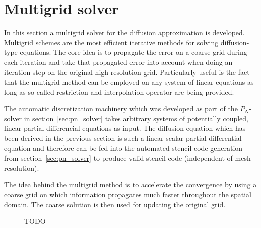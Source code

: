 \section{Multigrid solver}
\label{sec:da_solver}

In this section a multigrid solver for the diffusion approximation is developed. Multigrid schemes are the most efficient iterative methods for solving diffusion-type equations. The core idea is to propagate the error on a coarse grid during each iteration and take that propagated error into account when doing an iteration step on the original high resolution grid. Particularly useful is the fact that the multigrid method can be employed on any system of linear equations as long as so called restriction and interpolation operator are being provided. 

The automatic discretization machinery which was developed as part of the $P_N$-solver in section~\ref{sec:pn_solver} takes arbitrary systems of potentially coupled, linear partial differencial equations as input. The diffusion equation which has been derived in the previous section is such a linear scalar partial differential equation and therefore can be fed into the automated stencil code generation from section~\ref{sec:pn_solver} to produce valid stencil code (independent of mesh resolution).

The idea behind the multigrid method is to accelerate the convergence by using a coarse grid on which information propagates much faster throughout the spatial domain. The coarse solution is then used for updating the original grid.
\begin{figure}[h]
\centering
{}
\caption{TODO}
\label{fig:da_solver_multigrid_mesh}
\end{figure}

